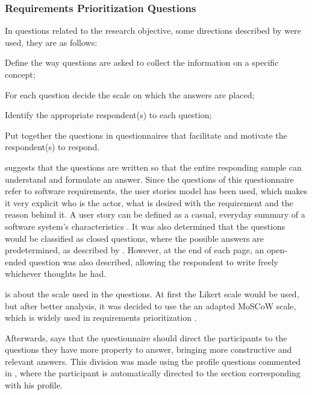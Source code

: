 \subsubsection{Requirements Prioritization Questions}

In questions related to the research objective, some directions described by  were used, they are as follows:
\begin{inparaenum}[(1)]
  \item Define the way questions are asked to collect the information on a
  specific concept;\label{suggestion:1}
  \item For each question decide the scale on which the answers are placed;\label{suggestion:2}
  \item Identify the appropriate respondent(s) to each question;\label{suggestion:3}
  \item Put together the questions in questionnaires that facilitate and motivate the respondent(s) to respond.\label{suggestion:4}
\end{inparaenum}

 suggests that the questions are written so that the entire responding sample can understand and formulate an answer. Since the questions of this questionnaire refer to software requirements, the user stories model has been used, which makes it very explicit who is the actor, what is desired with the requirement and the reason behind it. A user story can be defined as a casual, everyday summary of a software system's characteristics \cite{DIMITRIJEVIC2015352}. It was also determined that the questions would be classified as closed questions, where the possible answers are predetermined, as described by . However, at the end of each page, an open-ended question was also described, allowing the respondent to write freely whichever thoughts he had.

 is about the scale used in the questions. At first the Likert scale \cite{joshi2015likert} would be used, but after better analysis, it was decided to use the an adapted \ac{MoSCoW} scale, which is widely used in requirements prioritization \cite{waters2009prioritization}.

Afterwards,  says that the questionnaire should direct the participants to the questions they have more property to answer, bringing more constructive and relevant answers. This division was made using the profile questions commented in , where the participant is automatically directed to the section corresponding with his profile.

